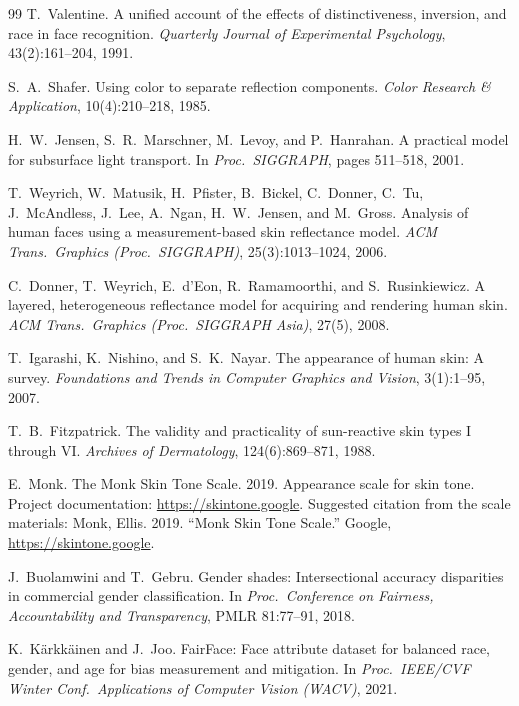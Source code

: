 \documentclass[10pt,twocolumn]{article}
\begin{document}
\begin{thebibliography}{99}
T.~Valentine.
A unified account of the effects of distinctiveness, inversion, and race in face recognition.
\emph{Quarterly Journal of Experimental Psychology}, 43(2):161--204, 1991.

S.~A.~Shafer.
Using color to separate reflection components.
\emph{Color Research \& Application}, 10(4):210--218, 1985.

H.~W.~Jensen, S.~R.~Marschner, M.~Levoy, and P.~Hanrahan.
A practical model for subsurface light transport.
In \emph{Proc.\ SIGGRAPH}, pages 511--518, 2001.

T.~Weyrich, W.~Matusik, H.~Pfister, B.~Bickel, C.~Donner, C.~Tu, J.~McAndless, J.~Lee, A.~Ngan, H.~W.~Jensen, and M.~Gross.
Analysis of human faces using a measurement-based skin reflectance model.
\emph{ACM Trans.\ Graphics (Proc.\ SIGGRAPH)}, 25(3):1013--1024, 2006.

C.~Donner, T.~Weyrich, E.~d'Eon, R.~Ramamoorthi, and S.~Rusinkiewicz.
A layered, heterogeneous reflectance model for acquiring and rendering human skin.
\emph{ACM Trans.\ Graphics (Proc.\ SIGGRAPH Asia)}, 27(5), 2008.

T.~Igarashi, K.~Nishino, and S.~K.~Nayar.
The appearance of human skin: A survey.
\emph{Foundations and Trends in Computer Graphics and Vision}, 3(1):1--95, 2007.

T.~B.~Fitzpatrick.
The validity and practicality of sun-reactive skin types {I} through {VI}.
\emph{Archives of Dermatology}, 124(6):869--871, 1988.

E.~Monk.
The {Monk} Skin Tone Scale.
2019.
Appearance scale for skin tone.
Project documentation: \url{https://skintone.google}.
Suggested citation from the scale materials: Monk, Ellis. 2019. ``Monk Skin Tone Scale.'' Google, \url{https://skintone.google}.

J.~Buolamwini and T.~Gebru.
Gender shades: Intersectional accuracy disparities in commercial gender classification.
In \emph{Proc.\ Conference on Fairness, Accountability and Transparency}, PMLR 81:77--91, 2018.

K.~K{\"a}rkk{\"a}inen and J.~Joo.
{FairFace}: Face attribute dataset for balanced race, gender, and age for bias measurement and mitigation.
In \emph{Proc.\ IEEE/CVF Winter Conf.\ Applications of Computer Vision (WACV)}, 2021.


\end{thebibliography}
\end{document}
